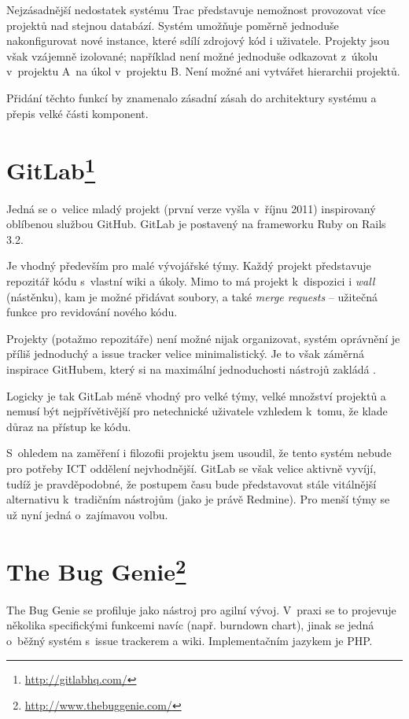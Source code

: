 \documentclass[thesis=B,czech]{FITthesis}[2012/05/02]
\begin{document}
Nejzásadnější nedostatek systému Trac představuje nemožnost provozovat více
projektů nad stejnou databází. Systém umožňuje poměrně jednoduše
nakonfigurovat nové instance, které sdílí zdrojový kód i uživatele.
Projekty jsou však vzájemně izolované; například není možné jednoduše
odkazovat z~úkolu v~projektu A~na úkol v~projektu B. Není
možné ani vytvářet hierarchii projektů.

Přidání těchto funkcí by znamenalo zásadní zásah do architektury systému
a přepis velké části komponent.

\section[GitLab]{GitLab\footnote{\url{http://gitlabhq.com/}}}

Jedná se o~velice mladý projekt (první verze vyšla v~říjnu 2011)
inspirovaný oblíbenou službou GitHub. GitLab je postavený na frameworku
Ruby on Rails 3.2.

Je vhodný především pro malé vývojářské týmy. Každý projekt
představuje repozitář kódu s~vlastní wiki a úkoly. Mimo to má projekt
k~dispozici i \emph{wall} (nástěnku), kam je možné přidávat soubory, a také
\emph{merge requests} -- užitečná funkce pro revidování nového kódu.

Projekty (potažmo repozitáře) není možné nijak organizovat,
systém oprávnění je příliš jednoduchý a issue tracker velice
minimalistický. Je to však záměrná inspirace GitHubem, který si na
maximální jednoduchosti nástrojů zakládá \citep[snímky
55-71]{Holman2011}.

Logicky je tak GitLab méně vhodný pro velké týmy, velké množství
projektů a nemusí být nejpřívětivější pro netechnické uživatele vzhledem
k~tomu, že klade důraz na přístup ke kódu.

S~ohledem na zaměření i filozofii projektu jsem usoudil, že tento systém
nebude pro potřeby ICT oddělení nejvhodnější. GitLab se však velice
aktivně vyvíjí, tudíž je pravděpodobné, že postupem času bude
představovat stále vitálnější alternativu k~tradičním nástrojům (jako je
právě Redmine). Pro menší týmy se už nyní jedná o~zajímavou volbu.

\section[The Bug Genie]{The Bug Genie\footnote{\url{http://www.thebuggenie.com/}}}

The Bug Genie se profiluje jako nástroj pro agilní vývoj. V~praxi se to
projevuje několika specifickými funkcemi navíc (např. burndown chart),
jinak se jedná o~běžný systém s~issue trackerem a wiki. Implementačním
jazykem je PHP.
\end{document}
